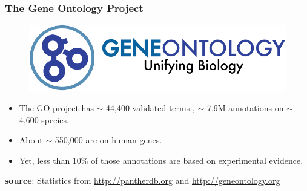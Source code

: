 \documentclass[aspectratio=169, 9pt]{beamer}
\begin{document}
\begin{frame}[label=geneontology]
\frametitle{The Gene Ontology Project}

\begin{figure}
\includegraphics[width=.5\linewidth]{go-logo.png}
\end{figure}

\begin{itemize}[<+->]
\item The GO project has $\sim$ 44,400 validated terms  \hyperlink{aphylo-goexample}{}, $\sim$ 7.9M annotations on $\sim$ 4,600 species.
\item About $\sim$ 550,000 are on human genes.
\item Yet, less than 10\% of those annotations are based on experimental evidence. %
\end{itemize}

\vfill
\hfill \small \textbf{source}: Statistics from \url{http://pantherdb.org} and \url{http://geneontology.org}\normalsize

\end{frame}
\end{document}
